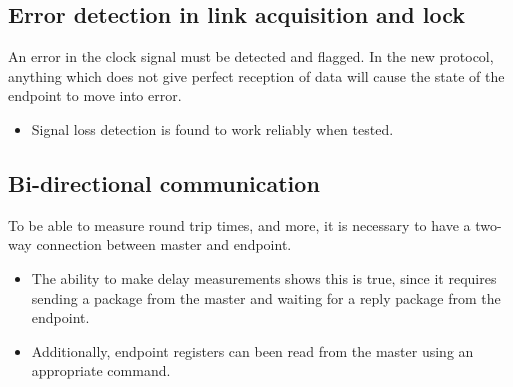\documentclass{dune}
\begin{document}
\subsection{Error detection in link acquisition and lock}
An error in the clock signal must be detected and flagged.
In the new protocol, anything which does not give perfect reception of data will cause the state of the endpoint to move into error.
\begin{itemize}
  \item Signal loss detection is found to work reliably when tested.
\end{itemize}


\subsection{Bi-directional communication}
To be able to measure round trip times, and more, it is necessary to have a two-way connection between master and endpoint.
\begin{itemize}
  \item The ability to make delay measurements shows this is true, since it requires sending a package from the master and waiting for a reply package from the endpoint.
  \item Additionally, endpoint registers can been read from the master using an appropriate command.
\end{itemize}
\end{document}
